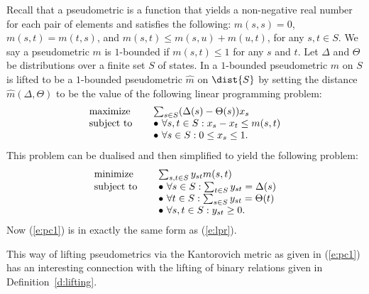\documentclass{article}
\begin{document}
\bigskip
Recall that a pseudometric
  is a function that yields a non-negative real number for each pair
  of elements and satisfies the following: $m(s,s)=0$,
  $m(s,t)=m(t,s)$, and $m(s,t)\leq m(s,u)+m(u,t)$, for any $s,t\in S$. We say a
  pseudometric $m$ is $1$-bounded if $m(s,t)\leq 1$ for any $s$ and
  $t$.
Let $\Delta$ and $\Theta$ be distributions over a finite set $S$ of
states. In \cite{BW01} a $1$-bounded pseudometric $m$ on $S$ is
lifted to be a $1$-bounded pseudometric $\hat{m}$ on $\dist{S}$ by
setting the distance $\hat{m}(\Delta,\Theta)$ to be the value of the
following linear programming problem:
\begin{equation}\label{e:pc}
\begin{array}{ll}
\mbox{maximize} & \sum_{s\in S} (\Delta(s)-\Theta(s))x_{s}\\
\mbox{subject to}\hspace{4mm} &     \bullet\  \forall s,t\in S: x_s-x_t\leq m(s,t)\\
 &     \bullet\  \forall s\in S: 0\leq x_s\leq 1.
\end{array}
\end{equation}
This problem can be dualised and then simplified to yield the
following problem:
\begin{equation}\label{e:pc1}
\begin{array}{ll}
\mbox{minimize} & \sum_{s,t\in S}y_{st} m(s,t) \\
\mbox{subject to}\hspace{4mm} &     \bullet\  \forall s\in S: \sum_{t\in S} y_{st}=\Delta(s)\\
 &     \bullet\  \forall t\in S: \sum_{s\in S}y_{st}= \Theta(t)\\
 &     \bullet\  \forall s,t\in S: y_{st}\geq 0.
\end{array}
\end{equation}
Now (\ref{e:pc1}) is in exactly the same form as (\ref{e:lpr}).

This way of lifting pseudometrics via the Kantorovich metric as
given in (\ref{e:pc1}) has an interesting connection with the
lifting of binary relations given in Definition~\ref{d:lifting}.
\end{document}
